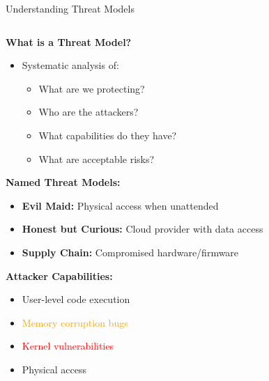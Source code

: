 \documentclass[aspectratio=169,12pt]{beamer}
\begin{document}
\begin{frame}{Understanding Threat Models}
    \begin{columns}
        \begin{column}{0.5\textwidth}
            \textbf{What is a Threat Model?}
            \begin{itemize}
                \item Systematic analysis of:
                \begin{itemize}
                    \item What are we protecting?
                    \item Who are the attackers?
                    \item What capabilities do they have?
                    \item What are acceptable risks?
                \end{itemize}
            \end{itemize}
            
            \vspace{0.3cm}
            \textbf{Named Threat Models:}
            \begin{itemize}
                \item \textbf{Evil Maid:} Physical access when unattended
                \item \textbf{Honest but Curious:} Cloud provider with data access
                \item \textbf{Supply Chain:} Compromised hardware/firmware
            \end{itemize}
            
            \vspace{0.3cm}
            \textbf{Attacker Capabilities:}
            \begin{itemize}
                \item \textcolor{green!60!black}{User-level code execution}
                \item \textcolor{orange}{Memory corruption bugs}
                \item \textcolor{red}{Kernel vulnerabilities}
                \item \textcolor{red!80!black}{Physical access}
            \end{itemize}
        \end{column}
        \begin{column}{0.5\textwidth}
\end{column}
\end{columns}
\end{frame}
\end{document}
